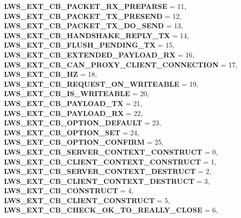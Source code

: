 \begin{DoxyCompactItemize}
{\bfseries L\+W\+S\+\_\+\+E\+X\+T\+\_\+\+C\+B\+\_\+\+P\+A\+C\+K\+E\+T\+\_\+\+R\+X\+\_\+\+P\+R\+E\+P\+A\+R\+SE} = 11, 
{\bfseries L\+W\+S\+\_\+\+E\+X\+T\+\_\+\+C\+B\+\_\+\+P\+A\+C\+K\+E\+T\+\_\+\+T\+X\+\_\+\+P\+R\+E\+S\+E\+ND} = 12, 
{\bfseries L\+W\+S\+\_\+\+E\+X\+T\+\_\+\+C\+B\+\_\+\+P\+A\+C\+K\+E\+T\+\_\+\+T\+X\+\_\+\+D\+O\+\_\+\+S\+E\+ND} = 13, 
\newline
{\bfseries L\+W\+S\+\_\+\+E\+X\+T\+\_\+\+C\+B\+\_\+\+H\+A\+N\+D\+S\+H\+A\+K\+E\+\_\+\+R\+E\+P\+L\+Y\+\_\+\+TX} = 14, 
{\bfseries L\+W\+S\+\_\+\+E\+X\+T\+\_\+\+C\+B\+\_\+\+F\+L\+U\+S\+H\+\_\+\+P\+E\+N\+D\+I\+N\+G\+\_\+\+TX} = 15, 
{\bfseries L\+W\+S\+\_\+\+E\+X\+T\+\_\+\+C\+B\+\_\+\+E\+X\+T\+E\+N\+D\+E\+D\+\_\+\+P\+A\+Y\+L\+O\+A\+D\+\_\+\+RX} = 16, 
{\bfseries L\+W\+S\+\_\+\+E\+X\+T\+\_\+\+C\+B\+\_\+\+C\+A\+N\+\_\+\+P\+R\+O\+X\+Y\+\_\+\+C\+L\+I\+E\+N\+T\+\_\+\+C\+O\+N\+N\+E\+C\+T\+I\+ON} = 17, 
\newline
{\bfseries L\+W\+S\+\_\+\+E\+X\+T\+\_\+\+C\+B\+\_\+HZ} = 18, 
{\bfseries L\+W\+S\+\_\+\+E\+X\+T\+\_\+\+C\+B\+\_\+\+R\+E\+Q\+U\+E\+S\+T\+\_\+\+O\+N\+\_\+\+W\+R\+I\+T\+E\+A\+B\+LE} = 19, 
{\bfseries L\+W\+S\+\_\+\+E\+X\+T\+\_\+\+C\+B\+\_\+\+I\+S\+\_\+\+W\+R\+I\+T\+E\+A\+B\+LE} = 20, 
{\bfseries L\+W\+S\+\_\+\+E\+X\+T\+\_\+\+C\+B\+\_\+\+P\+A\+Y\+L\+O\+A\+D\+\_\+\+TX} = 21, 
\newline
{\bfseries L\+W\+S\+\_\+\+E\+X\+T\+\_\+\+C\+B\+\_\+\+P\+A\+Y\+L\+O\+A\+D\+\_\+\+RX} = 22, 
{\bfseries L\+W\+S\+\_\+\+E\+X\+T\+\_\+\+C\+B\+\_\+\+O\+P\+T\+I\+O\+N\+\_\+\+D\+E\+F\+A\+U\+LT} = 23, 
{\bfseries L\+W\+S\+\_\+\+E\+X\+T\+\_\+\+C\+B\+\_\+\+O\+P\+T\+I\+O\+N\+\_\+\+S\+ET} = 24, 
{\bfseries L\+W\+S\+\_\+\+E\+X\+T\+\_\+\+C\+B\+\_\+\+O\+P\+T\+I\+O\+N\+\_\+\+C\+O\+N\+F\+I\+RM} = 25, 
\newline
{\bfseries L\+W\+S\+\_\+\+E\+X\+T\+\_\+\+C\+B\+\_\+\+S\+E\+R\+V\+E\+R\+\_\+\+C\+O\+N\+T\+E\+X\+T\+\_\+\+C\+O\+N\+S\+T\+R\+U\+CT} = 0, 
{\bfseries L\+W\+S\+\_\+\+E\+X\+T\+\_\+\+C\+B\+\_\+\+C\+L\+I\+E\+N\+T\+\_\+\+C\+O\+N\+T\+E\+X\+T\+\_\+\+C\+O\+N\+S\+T\+R\+U\+CT} = 1, 
{\bfseries L\+W\+S\+\_\+\+E\+X\+T\+\_\+\+C\+B\+\_\+\+S\+E\+R\+V\+E\+R\+\_\+\+C\+O\+N\+T\+E\+X\+T\+\_\+\+D\+E\+S\+T\+R\+U\+CT} = 2, 
{\bfseries L\+W\+S\+\_\+\+E\+X\+T\+\_\+\+C\+B\+\_\+\+C\+L\+I\+E\+N\+T\+\_\+\+C\+O\+N\+T\+E\+X\+T\+\_\+\+D\+E\+S\+T\+R\+U\+CT} = 3, 
\newline
{\bfseries L\+W\+S\+\_\+\+E\+X\+T\+\_\+\+C\+B\+\_\+\+C\+O\+N\+S\+T\+R\+U\+CT} = 4, 
{\bfseries L\+W\+S\+\_\+\+E\+X\+T\+\_\+\+C\+B\+\_\+\+C\+L\+I\+E\+N\+T\+\_\+\+C\+O\+N\+S\+T\+R\+U\+CT} = 5, 
{\bfseries L\+W\+S\+\_\+\+E\+X\+T\+\_\+\+C\+B\+\_\+\+C\+H\+E\+C\+K\+\_\+\+O\+K\+\_\+\+T\+O\+\_\+\+R\+E\+A\+L\+L\+Y\+\_\+\+C\+L\+O\+SE} = 6, 

\end{DoxyCompactItemize}
